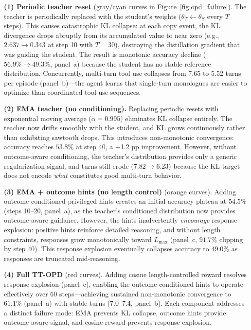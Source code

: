 \documentclass{article}
\begin{document}
\textbf{(1) Periodic teacher reset} (gray/cyan curves in Figure~\ref{fig:opd_failure}). The teacher is periodically replaced with the student's weights ($\theta_T \leftarrow \theta_S$ every $T$ steps). This causes catastrophic KL collapse: at each copy event, the KL divergence drops abruptly from its accumulated value to near zero (e.g., $2.637 \to 0.343$ at step 10 with $T{=}30$), destroying the distillation gradient that was guiding the student. The result is monotonic accuracy decline ($56.9\% \to 49.3\%$, panel~a) because the student has no stable reference distribution. Concurrently, multi-turn tool use collapses from 7.65 to 5.52 turns per episode (panel~b)---the agent learns that single-turn monologues are easier to optimize than coordinated tool-use sequences.

\textbf{(2) EMA teacher (no conditioning).} Replacing periodic resets with exponential moving average ($\alpha{=}0.995$) eliminates KL collapse entirely. The teacher now drifts smoothly with the student, and KL grows continuously rather than exhibiting sawtooth drops. This introduces non-monotonic convergence: accuracy reaches $53.8\%$ at step 40, a +1.2 pp improvement. However, without outcome-aware conditioning, the teacher's distribution provides only a generic regularization signal, and turns still erode ($7.82 \to 6.23$) because the KL target does not encode \emph{what} constitutes good multi-turn behavior.

\textbf{(3) EMA + outcome hints (no length control)} (orange curves). Adding outcome-conditioned privileged hints creates an initial accuracy plateau at $54.5\%$ (steps 10--20, panel~a), as the teacher's conditioned distribution now provides outcome-aware guidance. However, the hints inadvertently \emph{encourage} response explosion: positive hints reinforce detailed reasoning, and without length constraints, responses grow monotonically toward $L_{\max}$ (panel~c, $91.7\%$ clipping by step 40). This response explosion eventually collapses accuracy to $49.0\%$ as responses are truncated mid-reasoning.

\textbf{(4) Full TT-OPD} (red curves). Adding cosine length-controlled reward resolves response explosion (panel~c), enabling the outcome-conditioned hints to operate effectively over 60 steps---achieving sustained non-monotonic convergence to $61.1\%$ (panel~a) with stable turns ($7.0$--$7.4$, panel~b). Each component addresses a distinct failure mode: EMA prevents KL collapse, outcome hints provide outcome-aware signal, and cosine reward prevents response explosion.
\end{document}
